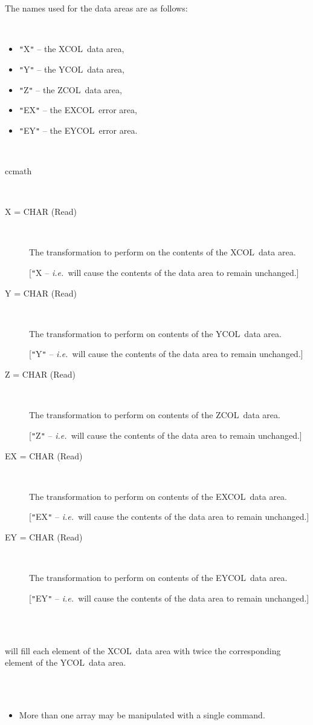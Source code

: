 \documentclass[twoside,11pt]{article}
\renewcommand{\_}{\texttt{\symbol{95}}}
\newcommand{\ie}{{\em i.e.\ }}
\newcommand{\xcol}{{\sf XCOL}}
\newcommand{\excol}{{\sf EXCOL}}
\newcommand{\ycol}{{\sf YCOL}}
\newcommand{\eycol}{{\sf EYCOL}}
\newcommand{\zcol}{{\sf ZCOL}}
\newlength{\sstexampleslength}
\newcommand{\sstusage}[1]{\item[Usage:] \mbox{}
\\[1.3ex]{\raggedright \ssttt #1}}
\newcommand{\sstparameters}[1]{
   \item[Parameters:] \mbox{} \\
   \vspace{-3.5ex}
   \begin{description}
      #1
   \end{description}
}
\newcommand{\sstexamples}[1]{
   \item[Examples:] \mbox{} \\
   \vspace{-3.5ex}
   \begin{description}
      #1
   \end{description}
}
\newcommand{\sstsubsection}[1]{ \item[{#1}] \mbox{} \\}
\newcommand{\sstexamplesubsection}[2]{\sloppy
\item[\parbox{\sstexampleslength}{\ssttt #1}] \mbox{} \vspace{1.0ex}
\\ #2 }
\newcommand{\sstnotes}[1]{\item[Notes:] \mbox{} \\[1.3ex] #1}
\newcommand{\sstitemlist}[1]{
  \mbox{} \\
  \vspace{-3.5ex}
  \begin{itemize}
     #1
  \end{itemize}
}
\newcommand{\sstitem}{\item}
\newcommand{\sstusage}[1]{\item[Usage:]
      \begin{description}
         {\ssttt #1}
      \end{description}
      \\
   }
\newcommand{\sstparameters}[1]{
      \item[Parameters:] \\
      \begin{description}
         #1
      \end{description}
      \\
   }
\newcommand{\sstexamples}[1]{
      \item[Examples:] \\
      \begin{description}
         #1
      \end{description}
      \\
   }
\newcommand{\sstsubsection}[1]{\item[{#1}]}
\newcommand{\sstexamplesubsection}[2]{\item[{\ssttt #1}] #2}
\newcommand{\sstnotes}[1]{\item[Notes:] #1 }
\newcommand{\sstitemlist}[1]{
      \begin{itemize}
         #1
      \end{itemize}
      \\
   }
\newcommand{\sstitem}{\item}
\begin{document}
\begin{sloppypar}
{{      The names used for the data areas are as follows:

      \sstitemlist{

         \sstitem
            {\tt "}X{\tt "} -- the \xcol\ data area,

         \sstitem
            {\tt "}Y{\tt "} -- the \ycol\ data area,

         \sstitem
            {\tt "}Z{\tt "} -- the \zcol\ data area,

         \sstitem
            {\tt "}EX{\tt "} -- the \excol\ error area,

         \sstitem
            {\tt "}EY{\tt "} -- the \eycol\ error area.
      }
   }
   \sstusage{
      ccmath
   }
   \sstparameters{
      \sstsubsection{
         X = \_CHAR (Read)
      }{
         The transformation to perform on the contents of the \xcol\ data
         area.

         [{\tt "}X -- \ie will cause the contents of the data area to remain
         unchanged.]
      }
      \sstsubsection{
         Y = \_CHAR (Read)
      }{
         The transformation to perform on contents of the \ycol\ data
         area.

         [{\tt "}Y{\tt "} -- \ie will cause the contents of the data area to remain
         unchanged.]
      }
      \sstsubsection{
         Z = \_CHAR (Read)
      }{
         The transformation to perform on contents of the \zcol\ data
         area.

         [{\tt "}Z{\tt "} -- \ie will cause the contents of the data area to remain
         unchanged.]
      }
      \sstsubsection{
         EX = \_CHAR (Read)
      }{
         The transformation to perform on contents of the \excol\ data
         area.

         [{\tt "}EX{\tt "} -- \ie will cause the contents of the data area to
         remain unchanged.]
      }
      \sstsubsection{
         EY = \_CHAR (Read)
      }{
         The transformation to perform on contents of the \eycol\ data
         area.

         [{\tt "}EY{\tt "} -- \ie will cause the contents of the data area to
         remain unchanged.]
      }
   }
   \sstexamples{
      \sstexamplesubsection{
         PONGO$>$ CCMATH X=2$*$Y
      }{
         will fill each element of the \xcol\ data area with twice the
         corresponding element of the \ycol\ data area.
      }
   }
   \sstnotes{
      \sstitemlist{

         \sstitem
         More than one array may be manipulated with a single command.

}}}
\end{sloppypar}
\end{document}
